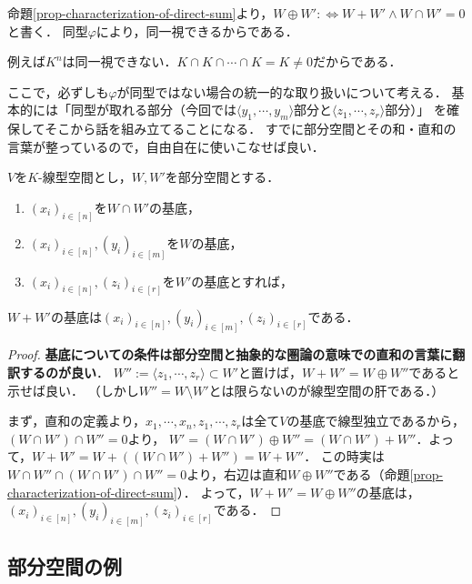 \documentclass[uplatex, 12pt, dvipdfmx]{jsreport}
\begin{document}
\begin{notation}
    命題\ref{prop-characterization-of-direct-sum}より，$W\oplus W':\Leftrightarrow W+W'\land W\cap W'=0$と書く．
    同型$\varphi$により，同一視できるからである．
\end{notation}

\begin{example}[いろいろな直和]
    例えば$K^n$は同一視できない．$K\cap K\cap\cdots\cap K=K\ne 0$だからである．
\end{example}

ここで，必ずしも$\varphi$が同型ではない場合の統一的な取り扱いについて考える．
基本的には「同型が取れる部分（今回では$\langle y_1,\cdots,y_m\rangle$部分と$\langle z_1,\cdots,z_r\rangle$部分）」
を確保してそこから話を組み立てることになる．
すでに部分空間とその和・直和の言葉が整っているので，自由自在に使いこなせば良い．

\begin{corollary}\label{cor-basis}
    $V$を$K$-線型空間とし，$W,W'$を部分空間とする．
    \begin{enumerate}
        \item $(x_i)_{i\in[n]}$を$W\cap W'$の基底，
        \item $(x_i)_{i\in[n]},(y_i)_{i\in[m]}$を$W$の基底，
        \item $(x_i)_{i\in[n]},(z_i)_{i\in[r]}$を$W'$の基底とすれば，
    \end{enumerate}
    $W+W'$の基底は$(x_i)_{i\in[n]},(y_i)_{i\in[m]},(z_i)_{i\in[r]}$である．
\end{corollary}
\begin{proof}
    \textbf{基底についての条件は部分空間と抽象的な圏論の意味での直和の言葉に翻訳するのが良い}．
    $W'':=\langle z_1,\cdots,z_r\rangle\subset W'$と置けば，$W+W'=W\oplus W''$であると示せば良い．
    （しかし$W''=W\setminus W'$とは限らないのが線型空間の肝である．）

    まず，直和の定義より，$x_1,\cdots,x_n,z_1,\cdots,z_r$は全て$V$の基底で線型独立であるから，$(W\cap W')\cap W''=0$より，
    $W'=(W\cap W')\oplus W''= (W\cap W')+ W''$．よって，$W+W'=W+((W\cap W')+ W'')=W+W''$．
    この時実は$W\cap W''\cap (W\cap W')\cap W''=0$より，右辺は直和$W\oplus W''$である（命題\ref{prop-characterization-of-direct-sum}）．
    よって，$W+W'=W\oplus W''$の基底は，$(x_i)_{i\in[n]},(y_i)_{i\in[m]},(z_i)_{i\in[r]}$である．
\end{proof}

\subsection{部分空間の例}
\end{document}
